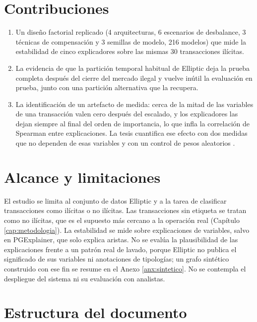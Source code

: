 \section{Contribuciones}

\begin{enumerate}
  \item Un diseño factorial replicado (4 arquitecturas, 6 escenarios de desbalance, 3 técnicas
        de compensación y 3 semillas de modelo, 216 modelos) que mide la estabilidad de cinco
        explicadores sobre las mismas 30 transacciones ilícitas.
  \item La evidencia de que la partición temporal habitual de Elliptic deja la prueba
        completa después del cierre del mercado ilegal y vuelve inútil la evaluación en
        prueba, junto con una partición alternativa que la recupera.
  \item La identificación de un artefacto de medida: cerca de la mitad de las variables de
        una transacción valen cero después del escalado, y los explicadores las dejan siempre
        al final del orden de importancia, lo que infla la correlación de Spearman entre
        explicaciones. La tesis cuantifica ese efecto con dos medidas que no dependen de esas
        variables y con un control de pesos aleatorios \cite{Adebayo2018Sanity}.
\end{enumerate}

\section{Alcance y limitaciones}

El estudio se limita al conjunto de datos Elliptic y a la tarea de clasificar transacciones
como ilícitas o no ilícitas. Las transacciones sin etiqueta se tratan como no ilícitas, que es
el supuesto más cercano a la operación real (Capítulo \ref{cap:metodologia}). La estabilidad se
mide sobre explicaciones de variables, salvo en PGExplainer, que solo explica aristas. No se
evalúa la plausibilidad de las explicaciones frente a un patrón real de lavado, porque Elliptic
no publica el significado de sus variables ni anotaciones de tipologías; un grafo sintético
construido con ese fin se resume en el Anexo \ref{anx:sintetico}. No se contempla el despliegue
del sistema ni su evaluación con analistas.

\section{Estructura del documento}

